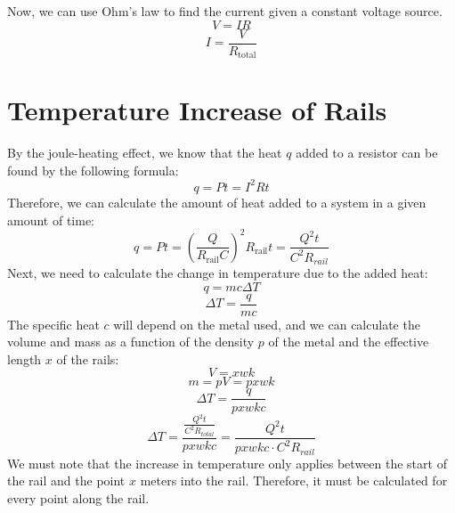 \documentclass[12pt]{article}
\begin{document}
Now, we can use Ohm's law to find the current given a constant voltage source.
\begin{equation}
    V = IR
\end{equation}
\begin{equation}
    I = \frac{V}{R_{\text{total}}}
    \label{eqn:eqn4}
\end{equation}

\section{Temperature Increase of Rails}
By the joule-heating effect, we know that the heat $q$ added to a resistor can be found by the following formula:
\begin{equation}
    q = Pt = I^2 R t 
\end{equation}
Therefore, we can calculate the amount of heat added to a system in a given amount of time:
\begin{equation}
    q = Pt = \left(\frac{Q}{R_{\text{rail}}C}\right)^2 R_{\text{rail}} t = \frac{Q^2 t}{C^2 R_{rail}}
\end{equation}
Next, we need to calculate the change in temperature due to the added heat:
\begin{equation}
    q = mc\Delta T
\end{equation}
\begin{equation}
    \Delta T = \frac{q}{mc}
\end{equation}
The specific heat $c$ will depend on the metal used, and we can calculate the volume and mass as a function of the density $p$ of the metal and the effective length $x$ of the rails:
\begin{equation}
    V = xwk
\end{equation}
\begin{equation}
    m = pV = pxwk
\end{equation}
\begin{equation}
    \Delta T = \frac{q}{pxwkc}
\end{equation}
\begin{equation}
    \Delta T = \frac{\frac{Q^2 t}{C^2 R_{total}}}{pxwkc} = \frac{Q^2 t}{pxwkc \cdot C^2 R_{rail}}
    \label{eqn:eqn6}
\end{equation}
We must note that the increase in temperature only applies between the start of the rail and the point $x$ meters into the rail. Therefore, it must be calculated for every point along the rail.
\end{document}
